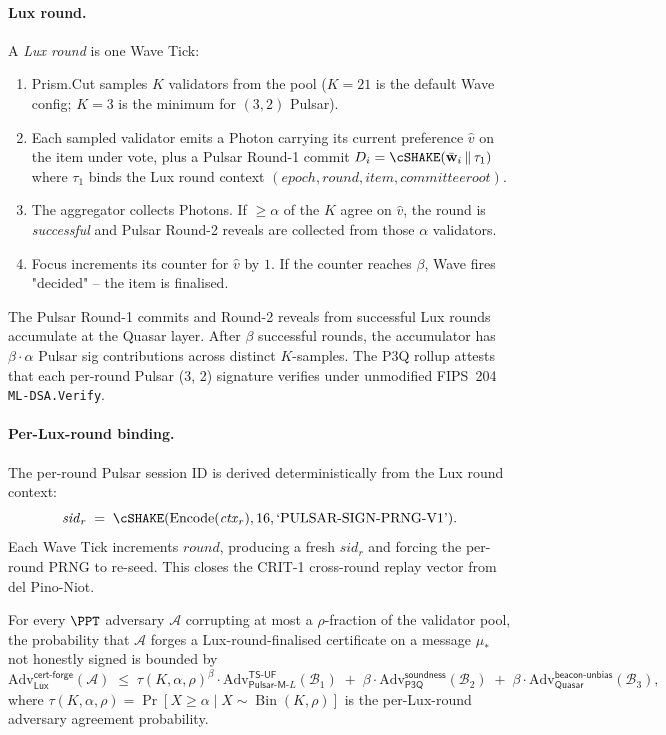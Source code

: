 \paragraph{Lux round.}
A \emph{Lux round} is one Wave Tick:

\begin{enumerate}[leftmargin=*, itemsep=0pt]
\item Prism.Cut samples $K$ validators from the pool ($K = 21$ is
the default Wave config; $K = 3$ is the minimum for $(3, 2)$
Pulsar).
\item Each sampled validator emits a Photon carrying its current
preference $\hat v$ on the item under vote, plus a Pulsar
Round-1 commit $D_i = \cSHAKE(\bar{\mathbf{w}}_i\,\|\,\tau_1)$ where
$\tau_1$ binds the Lux round context $(\mathit{epoch}, \mathit{round},
\mathit{item}, \mathit{committee root})$.
\item The aggregator collects Photons. If $\ge \alpha$ of the $K$
agree on $\hat v$, the round is \emph{successful} and Pulsar
Round-2 reveals are collected from those $\alpha$ validators.
\item Focus increments its counter for $\hat v$ by $1$. If the
counter reaches $\beta$, Wave fires "decided" -- the item is
finalised.
\end{enumerate}

The Pulsar Round-1 commits and Round-2 reveals from successful
Lux rounds accumulate at the Quasar layer. After $\beta$ successful
rounds, the accumulator has $\beta \cdot \alpha$ Pulsar sig
contributions across distinct $K$-samples. The P3Q rollup attests
that each per-round Pulsar (3, 2) signature verifies under
unmodified FIPS~204 \texttt{ML-DSA.Verify}.

\paragraph{Per-Lux-round binding.}
The per-round Pulsar session ID is derived deterministically from
the Lux round context:
\[
  \mathit{sid}_r \;=\; \cSHAKE(\text{Encode}(\mathit{ctx}_r), 16, \text{`PULSAR-SIGN-PRNG-V1'}).
\]
Each Wave Tick increments $\mathit{round}$, producing a fresh
$\mathit{sid}_r$ and forcing the per-round PRNG to re-seed. This
closes the CRIT-1 cross-round replay vector from del Pino-Niot.

\begin{theorem}
\label{thm:lux-round-metastable}
For every $\PPT$ adversary $\mathcal{A}$ corrupting at most a
$\rho$-fraction of the validator pool, the probability that
$\mathcal{A}$ forges a Lux-round-finalised certificate on a message
$\mu_*$ not honestly signed is bounded by
\[
  \mathrm{Adv}^{\mathsf{cert\text{-}forge}}_{\mathsf{Lux}}(\mathcal{A})
  \;\le\;
  \tau(K, \alpha, \rho)^\beta
  \cdot \mathrm{Adv}^{\mathsf{TS\text{-}UF}}_{\mathsf{Pulsar\text{-}M}\text{-}L}(\mathcal{B}_1)
  \;+\;
  \beta \cdot \mathrm{Adv}^{\mathsf{soundness}}_{\mathsf{P3Q}}(\mathcal{B}_2)
  \;+\;
  \beta \cdot \mathrm{Adv}^{\mathsf{beacon\text{-}unbias}}_{\mathsf{Quasar}}(\mathcal{B}_3),
\]
where $\tau(K, \alpha, \rho) = \Pr[X \ge \alpha \mid X \sim
\operatorname{Bin}(K, \rho)]$ is the per-Lux-round adversary
agreement probability.
\end{theorem}

